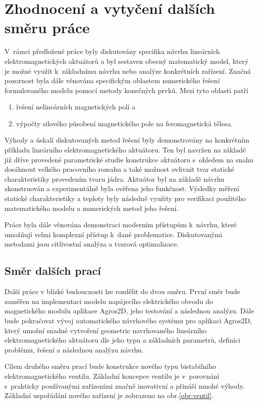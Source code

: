 \chapter{Zhodnocení a vytyčení dalších směru práce}
V~rámci předložené práce byly diskutovány specifika návrhu lineárních elektromagnetických aktuátorů a byl sestaven obecný matematický model, který je možné využít k~základnímu návrhu nebo analýze konkrétních zařízení. Značná pozornost byla dále věnována specifickým oblastem numerického řešení formulovaného modelu pomocí metody konečných prvků. Mezi tyto oblasti patří
\begin{enumerate}[a]
    \item řešení nelineárních magnetických polí a
    \item výpočty silového působení magnetického pole na feromagnetická tělesa.
\end{enumerate}

Výhody a úskalí diskutovaných metod řešení byly demonstrovány na konkrétním příkladu lineárního elektromagnetického aktuátoru. Ten byl navržen na základě již dříve provedené parametrické studie konstrukce aktuátoru s~ohledem na snahu dosáhnout velkého pracovního rozsahu a také možnost ovlivnit tvar statické charakteristiky provedením tvaru jádra. Aktuátor byl na základě návrhu zkonstruován a experimentálně byla ověřena jeho funkčnost. Výsledky měření statické charakteristiky a teploty byly následně využity pro verifikaci použitého matematického modelu a numerických metod jeho řešení.

Práce byla dále věnována demonstraci moderním přístupům k~návrhu, které umožňují velmi komplexní přístup k~dané problematice. Diskutovanými metodami jsou citlivostní analýza a tvarová optimalizace.

\section{Směr dalších prací}
Další práce v blízké budoucnosti lze rozdělit do dvou směru. První směr bude zaměřen na implementaci modelu napájecího elektrického obvodu do magnetického modulu aplikace Agros2D, jeho testování a následnou analýzu. Dále bude pokračovat vývoj automatického návrhového systému pro aplikaci Agros2D, který umožní snadné vytvoření geometrie navrhovaného lineárního elektromagnetického aktuátoru dle jeho typu a základních parametrů, definici problému, řešení a následnou analýzu návrhu.

Cílem druhého směru prací bude konstrukce nového typu bistabilního elektromagnetického ventilu. Základní koncepce ventilu je v~porovnání s~prakticky používanými zařízeními značně inovativní a přináší mnohé výhody. Základní uspořádání nového zařízení je zobrazeno na obr.\cref{obr:ventil}.

